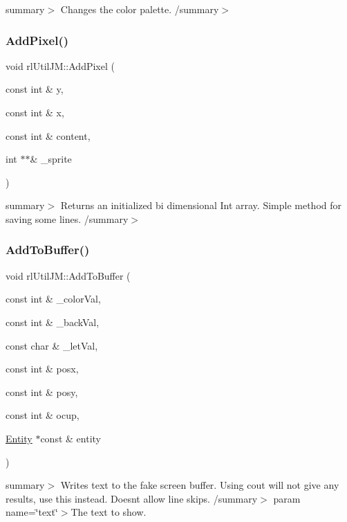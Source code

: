 summary$>$ Changes the color palette. /summary$>$ \mbox{\label{classrl_util_j_m_a0ef1e4ced4409dd7cae55c98a4bc27cd}} 
\subsubsection{\texorpdfstring{Add\+Pixel()}{AddPixel()}}
{\footnotesize\ttfamily void rl\+Util\+J\+M\+::\+Add\+Pixel (\begin{DoxyParamCaption}\item[{const int \&}]{y,  }\item[{const int \&}]{x,  }\item[{const int \&}]{content,  }\item[{int $\ast$$\ast$\&}]{\+\_\+sprite }\end{DoxyParamCaption})\hspace{0.3cm}{\ttfamily [static]}}

summary$>$ Returns an initialized bi dimensional Int array. Simple method for saving some lines. /summary$>$ \mbox{\label{classrl_util_j_m_a0c75d3b77f530a1efcbd2e1a3be0957e}} 
\subsubsection{\texorpdfstring{Add\+To\+Buffer()}{AddToBuffer()}}
{\footnotesize\ttfamily void rl\+Util\+J\+M\+::\+Add\+To\+Buffer (\begin{DoxyParamCaption}\item[{const int \&}]{\+\_\+color\+Val,  }\item[{const int \&}]{\+\_\+back\+Val,  }\item[{const char \&}]{\+\_\+let\+Val,  }\item[{const int \&}]{posx,  }\item[{const int \&}]{posy,  }\item[{const int \&}]{ocup,  }\item[{\hyperlink{class_entity}{Entity} $\ast$const \&}]{entity }\end{DoxyParamCaption})\hspace{0.3cm}{\ttfamily [static]}}

summary$>$ Writes text to the fake screen buffer. Using {\ttfamily cout} will not give any results, use this instead. Doesn\textquotesingle{}t allow line skips. /summary$>$ param name=\char`\"{}text\char`\"{}$>$The text to show.

